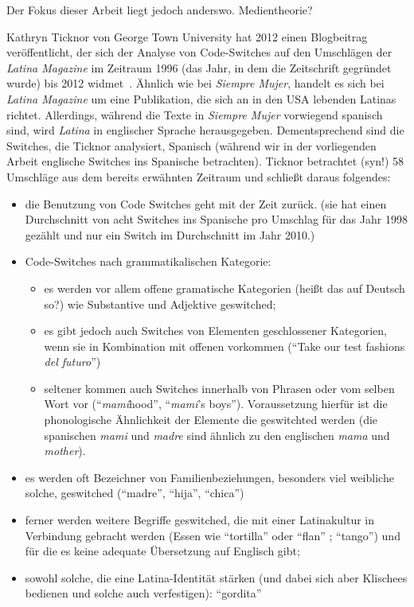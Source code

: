 Der Fokus dieser Arbeit liegt jedoch anderswo.
Medientheorie?

Kathryn Ticknor von George Town University hat 2012 einen Blogbeitrag veröffentlicht, der sich der Analyse von Code-Switches auf den Umschlägen der \textit{Latina Magazine} im Zeitraum 1996 (das Jahr, in dem die Zeitschrift gegründet wurde) bis 2012 widmet~\cite[]{Ticknor12}.
Ähnlich wie bei \textit{Siempre Mujer}, handelt es sich bei \textit{Latina Magazine} um eine Publikation, die sich an in den USA lebenden Latinas richtet.
Allerdings, während die Texte in \textit{Siempre Mujer} vorwiegend spanisch sind, wird \textit{Latina} in englischer Sprache herausgegeben.
Dementsprechend sind die Switches, die Ticknor analysiert, Spanisch (während wir in der vorliegenden Arbeit englische Switches ins Spanische betrachten).
Ticknor betrachtet (syn!) 58 Umschläge aus dem bereits erwähnten Zeitraum und schließt daraus folgendes:
\begin{itemize}
  \item die Benutzung von Code Switches geht mit der Zeit zurück. (sie hat einen Durchschnitt von acht Switches ins Spanische pro Umschlag für das Jahr 1998 gezählt  und nur ein Switch im Durchschnitt im Jahr 2010.)
  \item Code-Switches nach grammatikalischen Kategorie:
    \begin{itemize}
      \item es werden vor allem offene gramatische Kategorien (heißt das auf Deutsch so?) wie Substantive und Adjektive geswitched;
      \item es gibt jedoch auch Switches von Elementen geschlossener Kategorien, wenn sie in Kombination mit offenen vorkommen (``Take our test fashions \textit{del futuro}'')
      \item seltener kommen auch Switches innerhalb von Phrasen oder vom selben Wort vor (``\textit{mami}hood'', ``\textit{mami}'s boys''). Voraussetzung hierfür ist die phonologische Ähnlichkeit der Elemente die geswitchted werden (die spanischen \textit{mami} und \textit{madre} sind ähnlich zu den englischen \textit{mama} und \textit{mother}).
    \end{itemize}
  \item es werden oft Bezeichner von Familienbeziehungen, besonders viel weibliche solche, geswitched (``madre'', ``hija'', ``chica'')
  \item ferner werden weitere Begriffe geswitched, die mit einer Latinakultur in Verbindung gebracht werden (Essen wie ``tortilla'' oder ``flan'' ; ``tango'') und für die es keine adequate Übersetzung auf Englisch gibt;
  \item sowohl solche, die eine Latina-Identität stärken (und dabei sich aber Klischees bedienen und solche auch verfestigen): ``gordita''
\end{itemize}


